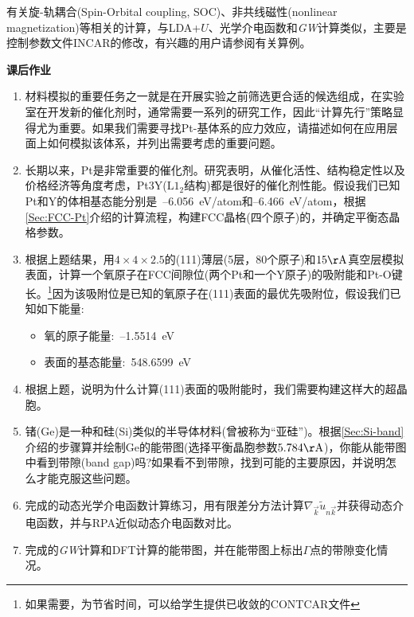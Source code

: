 有关旋-轨耦合(\textrm{Spin-Orbital coupling, SOC})、非共线磁性(\textrm{nonlinear magnetization})等相关的计算，与\textrm{LDA}+$U$、光学介电函数和\textit{GW}计算类似，主要是控制参数文件\textrm{INCAR}的修改，有兴趣的用户请参阅有关算例。

\clearpage\newpage
\textbf{课后作业}
\begin{enumerate}
	\item 材料模拟的重要任务之一就是在开展实验之前筛选更合适的候选组成，在实验室在开发新的催化剂时，通常需要一系列的研究工作，因此“计算先行”策略显得尤为重要。如果我们需要寻找\textrm{Pt}-基体系的应力效应，请描述如何在应用层面上如何模拟该体系，并列出需要考虑的重要问题。
	\item 长期以来，\textrm{Pt}是非常重要的催化剂。研究表明，从催化活性、结构稳定性以及价格经济等角度考虑，\textrm{Pt3Y}($\mathrm{L1}_2$结构)都是很好的催化剂性能。假设我们已知\textrm{Pt}和\textrm{Y}的体相基态能分别是~--6.056\textrm{~eV/atom}和\textrm{--6.466}\textrm{~eV/atom}，根据\ref{Sec:FCC-Pt}介绍的计算流程，构建\textrm{FCC}晶格(四个原子)的，并确定平衡态晶格参数。
	\item 根据上题结果，用$4\times4\times2.5$的(111)薄层(5层，80个原子)和$15\mathrm{\AA}$真空层模拟表面，计算一个氧原子在\textrm{FCC}间隙位(两个\textrm{Pt}和一个\textrm{Y}原子)的吸附能和\textrm{Pt-O}键长。\footnote{如果需要，为节省时间，可以给学生提供已收敛的\textrm{CONTCAR}文件}因为该吸附位是已知的氧原子在(111)表面的最优先吸附位，假设我们已知如下能量:~\\
		\begin{itemize}
			\item 氧的原子能量:~--1.5514\textrm{~eV}
			\item {}表面的基态能量:~548.6599\textrm{~eV}
		\end{itemize}
	\item 根据上题，说明为什么计算(111)表面的吸附能时，我们需要构建这样大的超晶胞。
	\item 锗(\textrm{Ge})是一种和硅(\textrm{Si})类似的半导体材料(曾被称为“亚硅”)。根据\ref{Sec:Si-band}介绍的步骤算并绘制\textrm{Ge}的能带图(选择平衡晶胞参数$5.784\mathrm{\AA}$)，你能从能带图中看到带隙(\textrm{band gap})吗?如果看不到带隙，找到可能的主要原因，并说明怎么才能克服这些问题。
	\item 完成的动态光学介电函数计算练习，用有限差分方法计算$\nabla_{\vec k}\tilde u_{n\vec k}$并获得动态介电函数，并与\textrm{RPA}近似动态介电函数对比。
	\item 完成的\textit{GW}计算和\textrm{DFT}计算的能带图，并在能带图上标出$\Gamma$点的带隙变化情况。
\end{enumerate}
